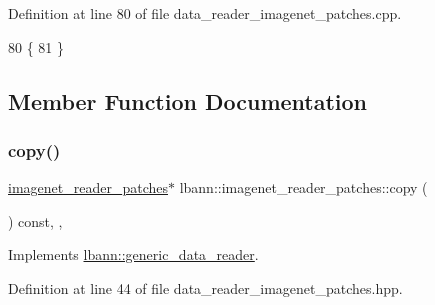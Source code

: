 Definition at line 80 of file data\+\_\+reader\+\_\+imagenet\+\_\+patches.\+cpp.


\begin{DoxyCode}
80                                                   \{
81 \}
\end{DoxyCode}


\subsection{Member Function Documentation}
\mbox{\label{classlbann_1_1imagenet__reader__patches_a6bb2c86a4416f8a74382951ab8827f1d}} 
\subsubsection{\texorpdfstring{copy()}{copy()}}
{\footnotesize\ttfamily \hyperlink{classlbann_1_1imagenet__reader__patches}{imagenet\+\_\+reader\+\_\+patches}$\ast$ lbann\+::imagenet\+\_\+reader\+\_\+patches\+::copy (\begin{DoxyParamCaption}{ }\end{DoxyParamCaption}) const\hspace{0.3cm}{\ttfamily [inline]}, {\ttfamily [override]}, {\ttfamily [virtual]}}



Implements \hyperlink{classlbann_1_1generic__data__reader_a208ba1223e7aaa75e94b728501f12f86}{lbann\+::generic\+\_\+data\+\_\+reader}.



Definition at line 44 of file data\+\_\+reader\+\_\+imagenet\+\_\+patches.\+hpp.


